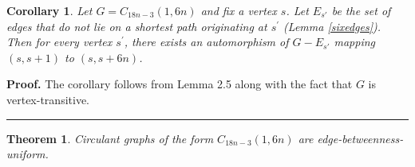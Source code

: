 \documentclass{article}%
\newtheorem{theorem}{Theorem}[section]
\newtheorem{corollary}{Corollary}[section]
\newenvironment{proof}[1][Proof]{\textbf{#1.} }{\ \rule{0.5em}{0.5em}}
\begin{document}
\begin{corollary}
\label{22}Let $G=C_{18n-3}(1,6n)$ and fix a vertex $s$. Let $E_{s\prime}$ be
the set of edges that do not lie on a shortest path originating at $s^{\prime
}$ (Lemma \ref{sixedges}). Then for every vertex $s^{\prime}$, there exists an
automorphism of $G-E_{s\prime}$ mapping $(s,s+1)$ to $(s,s+6n)$.
\end{corollary}

\begin{proof}
The corollary follows from Lemma 2.5 along with the fact that $G$ is vertex-transitive.
\end{proof}

\begin{theorem}
Circulant graphs of the form $C_{18n-3}(1,6n)$ are edge-betweenness-uniform.
\end{theorem}
\end{document}
